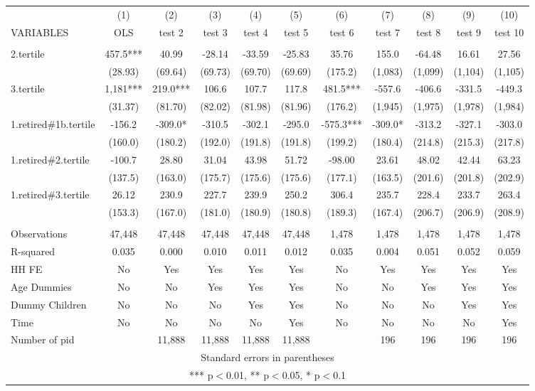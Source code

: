 \begin{tabular}{lcccccccccc} \hline
 & (1) & (2) & (3) & (4) & (5) & (6) & (7) & (8) & (9) & (10) \\
VARIABLES & OLS & test 2 & test 3 & test 4 & test 5 & test 6 & test 7 & test 8 & test 9 & test 10 \\ \hline
 &  &  &  &  &  &  &  &  &  &  \\
2.tertile & 457.5*** & 40.99 & -28.14 & -33.59 & -25.83 & 35.76 & 155.0 & -64.48 & 16.61 & 27.56 \\
 & (28.93) & (69.64) & (69.73) & (69.70) & (69.69) & (175.2) & (1,083) & (1,099) & (1,104) & (1,105) \\
3.tertile & 1,181*** & 219.0*** & 106.6 & 107.7 & 117.8 & 481.5*** & -557.6 & -406.6 & -331.5 & -449.3 \\
 & (31.37) & (81.70) & (82.02) & (81.98) & (81.96) & (176.2) & (1,945) & (1,975) & (1,978) & (1,984) \\
1.retired\#1b.tertile & -156.2 & -309.0* & -310.5 & -302.1 & -295.0 & -575.3*** & -309.0* & -313.2 & -327.1 & -303.0 \\
 & (160.0) & (180.2) & (192.0) & (191.8) & (191.8) & (199.2) & (180.4) & (214.8) & (215.3) & (217.8) \\
1.retired\#2.tertile & -100.7 & 28.80 & 31.04 & 43.98 & 51.72 & -98.00 & 23.61 & 48.02 & 42.44 & 63.23 \\
 & (137.5) & (163.0) & (175.7) & (175.6) & (175.6) & (177.1) & (163.5) & (201.6) & (201.8) & (202.9) \\
1.retired\#3.tertile & 26.12 & 230.9 & 227.7 & 239.9 & 250.2 & 306.4 & 235.7 & 228.4 & 233.7 & 263.4 \\
 & (153.3) & (167.0) & (181.0) & (180.9) & (180.8) & (189.3) & (167.4) & (206.7) & (206.9) & (208.9) \\
 &  &  &  &  &  &  &  &  &  &  \\
Observations & 47,448 & 47,448 & 47,448 & 47,448 & 47,448 & 1,478 & 1,478 & 1,478 & 1,478 & 1,478 \\
R-squared & 0.035 & 0.000 & 0.010 & 0.011 & 0.012 & 0.035 & 0.004 & 0.051 & 0.052 & 0.059 \\
HH FE & No & Yes & Yes & Yes & Yes & No & Yes & Yes & Yes & Yes \\
Age Dummies & No & No & Yes & Yes & Yes & No & No & Yes & Yes & Yes \\
Dummy Children & No & No & No & Yes & Yes & No & No & No & Yes & Yes \\
Time & No & No & No & No & Yes & No & No & No & No & Yes \\
 Number of pid &  & 11,888 & 11,888 & 11,888 & 11,888 &  & 196 & 196 & 196 & 196 \\ \hline
\multicolumn{11}{c}{ Standard errors in parentheses} \\
\multicolumn{11}{c}{ *** p$<$0.01, ** p$<$0.05, * p$<$0.1} \\
\end{tabular}
